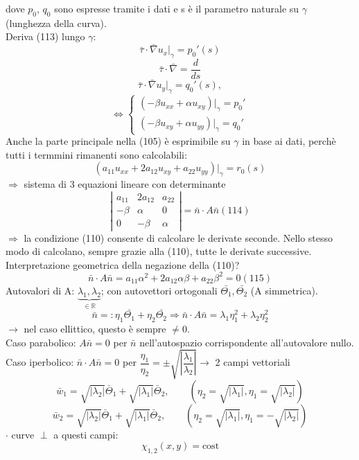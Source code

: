 \documentclass[a4paper,11pt]{report}
\newcommand{\R}{\mathbb{R}}
\begin{document}
dove $p_0$, $q_0$ sono espresse tramite i dati e s è il parametro naturale su $\gamma$ (lunghezza della curva).\\
Deriva (113) lungo $\gamma$:
$$
\bar{\tau}\cdot \bar{\nabla} u_x|_{\gamma}= p_0'(s)
$$
$$
\bar{\tau}\cdot \bar{\nabla}=\dfrac{d}{ds}
$$
$$
\bar{\tau}\cdot \bar{\nabla}u_y|_{\gamma}=q_0'(s),
$$
$$
\Leftrightarrow \left\{\begin{matrix}
(-\beta u_{xx} + \alpha u_{xy})|_{\gamma}=p_0'\\
(-\beta u_{xy} + \alpha u_{yy})|_{\gamma}=q_0'
\end{matrix}\right.
$$
Anche la parte principale nella (105) è esprimibile su $\gamma$ in base ai dati, perchè tutti i termmini rimanenti sono calcolabili:
$$
(a_{11}u_{xx}+2a_{12}u_{xy}+a_{22}u_{yy})|_{\gamma}=r_0(s)
$$
$\Rightarrow$ sistema di 3 equazioni lineare con determinante
\begin{equation}\left| \begin{matrix}

a_{11} & 2a_{12} & a_{22}\\
-\beta & \alpha & 0 \\
0 & -\beta & \alpha 
\end{matrix}\right| = \bar{n}\cdot A \bar{n}(114)
\end{equation}
$\Rightarrow$ la condizione (110) consente di calcolare le derivate seconde. Nello stesso modo di calcolano, sempre grazie alla (110), tutte le derivate successive.\\
Interpretazione geometrica della negazione della (110)?
\begin{equation}
\bar{n}\cdot A\bar{n}=a_{11}\alpha^2+2a_{12}\alpha\beta + a_{22}\beta^2=0 (115)
\end{equation}
Autovalori di A: $\underset{\in\R}{\underbrace{\lambda_1,\lambda_2}}$; con autovettori ortogonali $\bar{\Theta_1},\bar{\Theta_2}$ (A simmetrica).
$$
\bar{n}=: \eta_1 \bar{\Theta_1} + \eta_2\bar{\Theta_2} \Rightarrow \bar{n}\cdot A \bar{n}=\lambda_1\eta_1^2 + \lambda_2\eta_2^2
$$
$\rightarrow$ nel caso ellittico, questo è sempre $\neq 0$.\\
Caso parabolico: $A\bar{n}=0$ per $\bar{n}$ nell'autospazio corrispondente all'autovalore nullo.\\
Caso iperbolico: $\bar{n}\cdot A\bar{n} = 0$ per $\dfrac{\eta_1}{\eta_2}=\pm \sqrt{\left|\dfrac{\lambda_1}{\lambda_2}\right|} \rightarrow$ 2 campi vettoriali
$$
\bar{w}_1 = \sqrt{|\lambda_2|}\bar{\Theta}_1 + \sqrt{|\lambda_1|}\bar{\Theta}_2, \qquad (\eta_2=\sqrt{|\lambda_1|}, \eta_1=\sqrt{|\lambda_2|})
$$ 
$$
\bar{w}_2 = \sqrt{|\lambda_2|}\bar{\Theta}_1 + \sqrt{|\lambda_1|}\bar{\Theta}_2, \qquad (\eta_2=\sqrt{|\lambda_1|}, \eta_1=-\sqrt{|\lambda_2|})
$$
$\cdot$ curve $\perp$ a questi campi:
$$
\chi_{1,2}(x,y)=\text{cost}
$$
\end{document}
